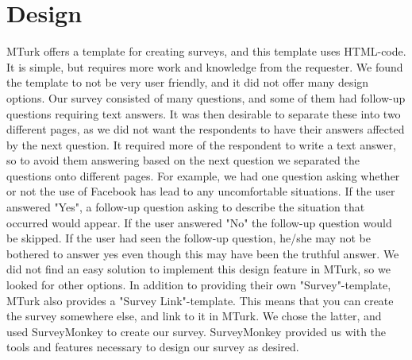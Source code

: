 \section{Design}
MTurk offers a template for creating surveys, and this template uses HTML-code. It is simple, but requires more work and knowledge from the requester. We found the template to not be very user friendly, and it did not offer many design options. Our survey consisted of many questions, and some of them had follow-up questions requiring text answers. It was then desirable to separate these into two different pages, as we did not want the respondents to have their answers affected by the next question. It required more of the respondent to write a text answer, so to avoid them answering based on the next question we separated the questions onto different pages. For example, we had one question asking whether or not the use of Facebook has lead to any uncomfortable situations. If the user answered "Yes", a follow-up question asking to describe the situation that occurred would appear. If the user answered "No" the follow-up question would be skipped. If the user had seen the follow-up question, he/she may not be bothered to answer yes even though this may have been the truthful answer. We did not find an easy solution to implement this design feature in MTurk, so we looked for other options. In addition to providing their own "Survey"-template, MTurk also provides a "Survey Link"-template. This means that you can create the survey somewhere else, and link to it in MTurk. We chose the latter, and used SurveyMonkey to create our survey. SurveyMonkey provided us with the tools and features necessary to design our survey as desired. 

